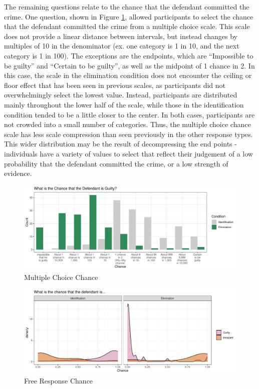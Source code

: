 \documentclass[print]{nuthesis}
\begin{document}
The remaining questions relate to the chance that the defendant committed the crime.
One question, shown in Figure \ref{fig:fixedlike}, allowed participants to select the chance that the defendant committed the crime from a multiple choice scale.
This scale does not provide a linear distance between intervals, but instead changes by multiples of 10 in the denominator (ex. one category is 1 in 10, and the next category is 1 in 100).
The exceptions are the endpoints, which are ``Impossible to be guilty'' and ``Certain to be guilty'', as well as the midpoint of 1 chance in 2.
In this case, the scale in the elimination condition does not encounter the ceiling or floor effect that has been seen in previous scales, as participants did not overwhelmingly select the lowest value.
Instead, participants are distributed mainly throughout the lower half of the scale, while those in the identification condition tended to be a little closer to the center.
In both cases, participants are not crowded into a small number of categories.
Thus, the multiple choice chance scale has less scale compression than seen previously in the other response types.
This wider distribution may be the result of decompressing the end points - individuals have a variety of values to select that reflect their judgement of a low probability that the defendant committed the crime, or a low strength of evidence.

\begin{figure}

{\centering \includegraphics[width=\linewidth]{thesis_files/figure-latex/fixedlike-1} 

}

\caption{Multiple Choice Chance}\label{fig:fixedlike}
\end{figure}

\begin{figure}

{\centering \includegraphics[width=\linewidth]{thesis_files/figure-latex/freelike-1} 

}

\caption{Free Response Chance}\label{fig:freelike}
\end{figure}
\end{document}
